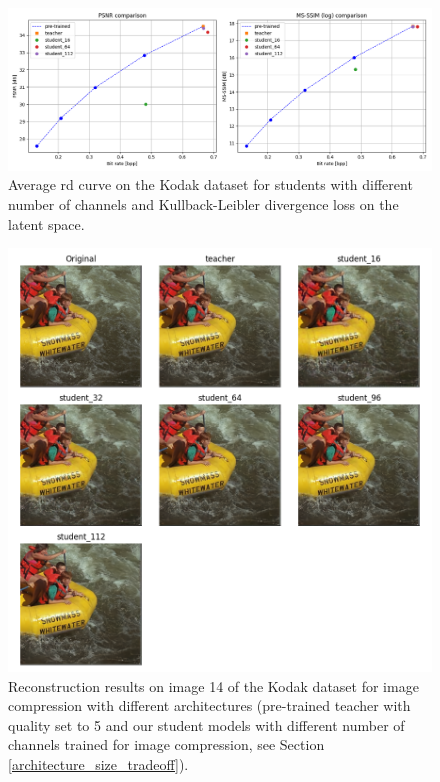\documentclass{article}
\begin{document}
\begin{figure}
  \centering
  \includegraphics[width=15cm]{kd_lic_rd_channels_kld.png}
  \caption[Average \acrshort{rd} curve on the Kodak dataset for students with different number of channels and Kullback-Leibler divergence loss on the latent space.]{Average \acrshort{rd} curve on the Kodak dataset for students with different number of channels and Kullback-Leibler divergence loss on the latent space.}
  \label{appendix:kd_lic_1_kld}
\end{figure}

\begin{figure}
  \centering
  \includegraphics[width=15cm]{kd_lic_kodak_14.png}
  \caption[Reconstruction results on image 14 of the Kodak dataset for image compression with different architectures.]{Reconstruction results on image 14 of the Kodak dataset for image compression with different architectures (pre-trained teacher with \textsf{quality} set to 5 and our student models with different number of channels trained for image compression, see Section \ref{architecture_size_tradeoff}).}
  \label{appendix:kd_lic_2:a}
\end{figure}
\end{document}
